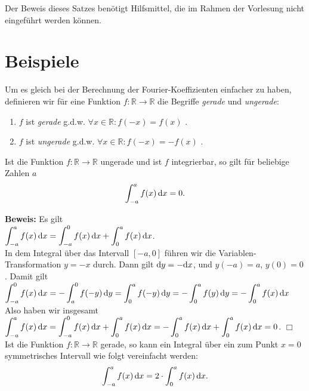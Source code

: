 \noindent
Der Beweis dieses Satzes ben\"otigt Hilfsmittel, die im Rahmen der Vorlesung
nicht eingef\"uhrt werden k\"onnen.

\section{Beispiele}
Um es gleich bei der Berechnung der Fourier-Koeffizienten einfacher zu haben, definieren
wir f\"ur eine Funktion $f:\mathbb{R} \rightarrow \mathbb{R}$ die Begriffe \emph{gerade}
und \emph{ungerade}: 
\begin{enumerate}
\item $f$ ist \emph{gerade}   g.d.w. $\forall x\in\mathbb{R}: f(-x) =  f(x)$ .
\item $f$ ist \emph{ungerade} g.d.w. $\forall x\in\mathbb{R}: f(-x) = -f(x)$ .
\end{enumerate}
Ist die Funktion $f:\mathbb{R} \rightarrow \mathbb{R}$ ungerade und ist $f$ integrierbar,
so gilt f\"ur beliebige Zahlen $a$ 
\begin{equation}
  \label{eq:intUngerade}
 \int_{-a}^a f(x)\,\textrm{d} x = 0.  
\end{equation}
\vspace*{0.3cm}

\noindent
\textbf{Beweis:} Es gilt 
\\[0.3cm]
\hspace*{1.3cm}
$\displaystyle \int_{-a}^a f(x)\,\textrm{d} x = \int_{-a}^0 f(x)\,\textrm{d} x + \int_{0}^a f(x)\,\textrm{d} x$.
\\[0.3cm]
In dem Integral \"uber das Intervall $[-a,0]$ f\"uhren wir die Variablen-Transformation $y =
-x$ durch.  Dann gilt $\textrm{d} y = - \textrm{d} x$, und $y(-a) = a$, $y(0) = 0$.  Damit gilt
\\[0.3cm]
\hspace*{1.3cm}
$
\displaystyle \int_{-a}^0 f(x)\,\textrm{d} x =  -\int_{a}^0 f(-y)\,\textrm{d} y  
  = \int_{0}^a f(-y)\,\textrm{d} y  
  = - \int_{0}^a f(y)\,\textrm{d} y  
  = - \int_{0}^a f(x)\,\textrm{d} x  
$
\\[0.3cm]
Also haben wir insgesamt
\\[0.3cm]
\hspace*{1.3cm}
$\displaystyle \int_{-a}^a f(x)\,\textrm{d} x = \int_{-a}^0 f(x)\,\textrm{d} x + \int_{0}^a f(x)\,\textrm{d} x
 = -\int_{0}^a f(x)\,\textrm{d} x + \int_{0}^a f(x)\,\textrm{d} x = 0$. \hspace*{\fill} $\Box$
\\[0.3cm]
Ist die Funktion $f:\mathbb{R} \rightarrow \mathbb{R}$ gerade, so kann ein Integral \"uber
ein zum Punkt $x=0$ symmetrisches Intervall wie folgt vereinfacht werden: 
\begin{equation}
  \label{eq:intGerade}
 \int_{-a}^a f(x)\,\textrm{d} x = 2 \cdot \int_{0}^a f(x)\,\textrm{d} x.  
\end{equation}
\vspace*{0.3cm}

